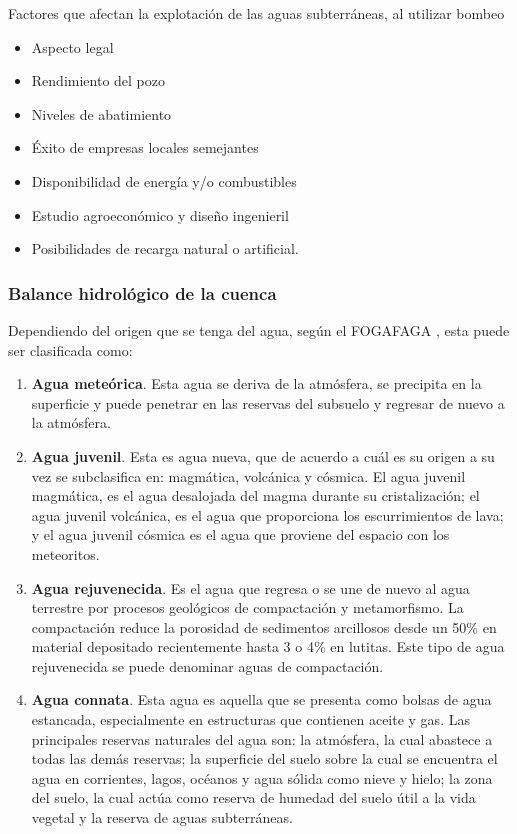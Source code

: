 Factores que afectan la explotación de las aguas subterráneas, al utilizar bombeo
\begin{itemize}
	\item Aspecto legal
	\item Rendimiento del pozo
	\item Niveles de abatimiento
	\item Éxito de empresas locales semejantes
	\item Disponibilidad de energía y/o combustibles
	\item Estudio agroeconómico y diseño ingenieril
	\item Posibilidades de recarga natural o artificial.
\end{itemize}

\subsubsection{Balance hidrológico de la cuenca}
Dependiendo del origen que se tenga del agua, según el FOGAFAGA \autocite{de1958fomento}, esta
puede ser clasificada como:

\begin{enumerate}
	\item \textbf{Agua meteórica}. Esta agua se deriva de la atmósfera, se precipita en la
	      superficie y puede penetrar en las reservas del subsuelo y regresar de nuevo a la
	      atmósfera.
	\item \textbf{Agua juvenil}. Esta es agua nueva, que de acuerdo a cuál es su origen a su vez
	      se subclasifica en: magmática, volcánica y cósmica. El agua juvenil magmática, es el
	      agua desalojada del magma durante su cristalización; el agua juvenil volcánica, es el
	      agua que proporciona los escurrimientos de lava; y el agua juvenil cósmica es el agua
	      que proviene del espacio con los meteoritos.
	\item \textbf{Agua rejuvenecida}. Es el agua que regresa o se une de nuevo al agua terrestre
	      por procesos geológicos de compactación y metamorfismo. La compactación reduce la
	      porosidad de sedimentos arcillosos desde un 50\% en material depositado
	      recientemente hasta 3 o 4\% en lutitas. Este tipo de agua rejuvenecida se puede
	      denominar aguas de compactación.
	\item \textbf{Agua connata}. Esta agua es aquella que se presenta como bolsas de agua
	      estancada, especialmente en estructuras que contienen aceite y gas.
	      Las principales reservas naturales del agua son: la atmósfera, la cual abastece a
	      todas las demás reservas; la superficie del suelo sobre la cual se encuentra el agua en
	      corrientes, lagos, océanos y agua sólida como nieve y hielo; la zona del suelo, la cual
	      actúa como reserva de humedad del suelo útil a la vida vegetal y la reserva de aguas
	      subterráneas.
\end{enumerate}

